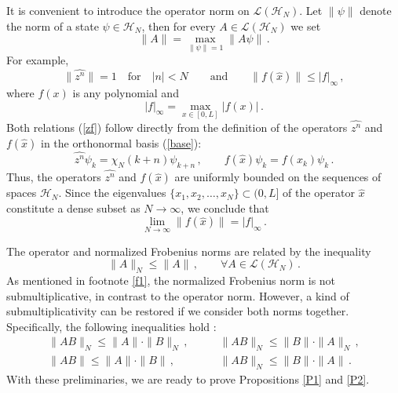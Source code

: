 \documentclass[12pt,a4paper]{article}
\numberwithin{equation}{section}
\theoremstyle{theorem}
\theoremstyle{remark}
\newcommand{\hn}{\mathcal{H}_N}
\begin{document}
It is convenient to introduce the operator norm on $\mathscr{L}(\hn)$. Let $\|\psi\|$ denote the norm of a state  $\psi\in \hn$, then for every $A\in\mathscr{L}(\hn)$ we set
\begin{equation}
    \|A\|=\max_{\|\psi\| =1}\| A\psi\| \,.
\end{equation}
For example, 
\begin{equation}\label{zf}
    \|\widehat {z^n}\|=1\quad \mbox{for}\quad |n|<N
 \qquad \mbox{and}\qquad \|f(\hat x)\|\leq |f|_\infty\,,
\end{equation}
where $f(x)$ is any polynomial and 
\begin{equation}
    |f|_\infty=\max_{x\in [0,L]} |f(x)|\,.
\end{equation}
Both relations (\ref{zf}) follow directly from the definition of the operators $\widehat {z^n}$ and $f(\hat x)$  in the orthonormal basis (\ref{base}): 
\begin{equation}
    \widehat {z^n}\psi_k=\chi_N(k+n)\psi_{k+n}\,, \qquad   f(\hat x)\psi_k =f(x_k)\psi_k \,.
    \end{equation} 
Thus, the operators $\widehat {z^n}$ and $f(\hat x)$ are  uniformly bounded on the sequences of spaces $\hn$. Since the eigenvalues $\{x_1,x_2,\ldots, x_N\}\subset (0,L]$ of the operator $\hat x$ constitute a dense subset as $N\rightarrow\infty$, we conclude that
\begin{equation}\label{fN}
    \lim_{N\rightarrow \infty}\|f(\hat x)\|=|f|_\infty\,.
\end{equation}

The operator and normalized Frobenius norms are related by the inequality 
\begin{equation}
    \|A\|_N\leq \|A\|\,,\qquad \forall{A\in \mathscr{L}(\hn)}\,.
\end{equation}
As mentioned in footnote \ref{f1}, the normalized Frobenius norm is not submultiplicative, in contrast to the operator norm. However, a kind of submultiplicativity can be restored if we consider both norms together. Specifically, the following inequalities hold \cite{vonNeumann1942, CIT-006}:
\begin{equation}\label{sm}
\begin{array}{ll}
   \|AB\|_N\leq \|A\|\cdot\|B\|_N\,, &\qquad  \|AB\|_N\leq \|B\| \cdot\|A\|_N\,, \\[5mm] 
  \|AB\|\leq \|A\|\cdot\|B\|\,, &\qquad \|AB\|_N\leq \|B\| \cdot\|A\|\,.\end{array}
  \end{equation}
With these preliminaries, we are ready to prove Propositions \ref{P1} and \ref{P2}.
\end{document}

